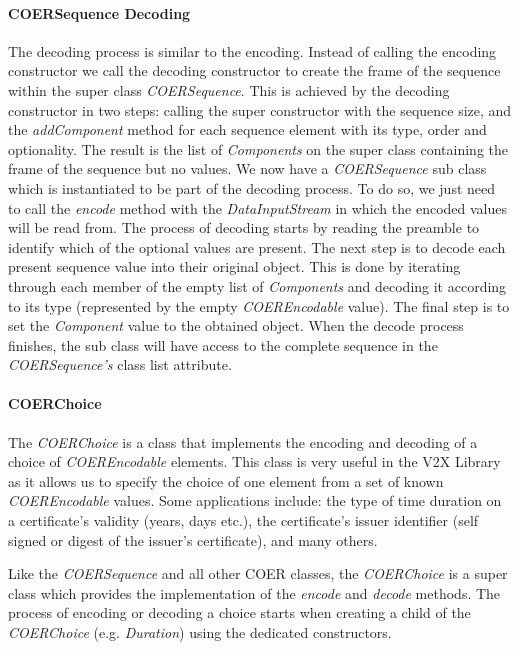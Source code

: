 \paragraph{COERSequence Decoding}
The decoding process is similar to the encoding. Instead of calling the encoding constructor we call the decoding constructor to create the frame of the sequence within the super class \textit{COERSequence}. This is achieved by the decoding constructor in two steps: calling the super constructor with the sequence size, and the \textit{addComponent} method for each sequence element with its type, order and optionality. The result is the list of \textit{Components} on the super class containing the frame of the sequence but no values. We now have a \textit{COERSequence} sub class which is instantiated to be part of the decoding process. To do so, we just need to call the \textit{encode} method with the \textit{DataInputStream} in which the encoded values will be read from. The process of decoding starts by reading the preamble to identify which of the optional values are present. The next step is to decode each present sequence value into their original object. This is done by iterating through each member of the empty list of \textit{Components} and decoding it according to its type (represented by the empty \textit{COEREncodable} value). The final step is to set the \textit{Component} value to the obtained object. When the decode process finishes, the sub class will have access to the complete sequence in the \textit{COERSequence's} class list attribute.


\paragraph{COERChoice}
The \textit{COERChoice} is a class that implements the encoding and decoding of a choice of \textit{COEREncodable} elements. This class is very useful in the V2X Library as it allows us to specify the choice of one element from a set of known \textit{COEREncodable} values. Some applications include: the type of time duration on a certificate's validity (years, days etc.), the certificate's issuer identifier (self signed or digest of the issuer's certificate), and many others. 

Like the \textit{COERSequence} and all other COER classes, the \textit{COERChoice} is a super class which provides the implementation of the \textit{encode} and \textit{decode} methods. The process of encoding or decoding a choice starts when creating a child of the \textit{COERChoice} (e.g. \textit{Duration}) using the dedicated constructors. 


